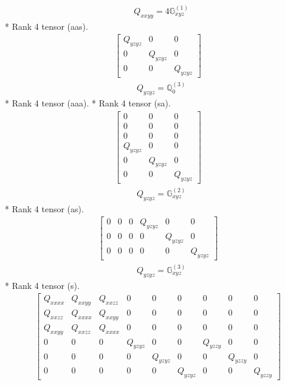 \documentclass[fleqn,8pt,landscape]{jsarticle}
\begin{document}
\begin{align*}
& Q_{xxyy} = 4 \mathbb{G}_{xyz}^{(1)}
\end{align*}
* Rank 4 tensor (aas).
\begin{align*}
\begin{bmatrix} Q_{yzyz} & 0 & 0 \\ 0 & Q_{yzyz} & 0 \\ 0 & 0 & Q_{yzyz} \end{bmatrix}
\end{align*}
\begin{align*}
& Q_{yzyz} = \mathbb{Q}_{0}^{(3)}
\end{align*}
* Rank 4 tensor (aaa).
* Rank 4 tensor (sa).
\begin{align*}
\begin{bmatrix} 0 & 0 & 0 \\ 0 & 0 & 0 \\ 0 & 0 & 0 \\ Q_{yzyz} & 0 & 0 \\ 0 & Q_{yzyz} & 0 \\ 0 & 0 & Q_{yzyz} \end{bmatrix}
\end{align*}
\begin{align*}
& Q_{yzyz} = \mathbb{G}_{xyz}^{(2)}
\end{align*}
* Rank 4 tensor (as).
\begin{align*}
\begin{bmatrix} 0 & 0 & 0 & Q_{yzyz} & 0 & 0 \\ 0 & 0 & 0 & 0 & Q_{yzyz} & 0 \\ 0 & 0 & 0 & 0 & 0 & Q_{yzyz} \end{bmatrix}
\end{align*}
\begin{align*}
& Q_{yzyz} = \mathbb{G}_{xyz}^{(3)}
\end{align*}
* Rank 4 tensor (s).
\begin{align*}
\begin{bmatrix} Q_{xxxx} & Q_{xxyy} & Q_{xxzz} & 0 & 0 & 0 & 0 & 0 & 0 \\ Q_{xxzz} & Q_{xxxx} & Q_{xxyy} & 0 & 0 & 0 & 0 & 0 & 0 \\ Q_{xxyy} & Q_{xxzz} & Q_{xxxx} & 0 & 0 & 0 & 0 & 0 & 0 \\ 0 & 0 & 0 & Q_{yzyz} & 0 & 0 & Q_{yzzy} & 0 & 0 \\ 0 & 0 & 0 & 0 & Q_{yzyz} & 0 & 0 & Q_{yzzy} & 0 \\ 0 & 0 & 0 & 0 & 0 & Q_{yzyz} & 0 & 0 & Q_{yzzy} \end{bmatrix}
\end{align*}
\end{document}
